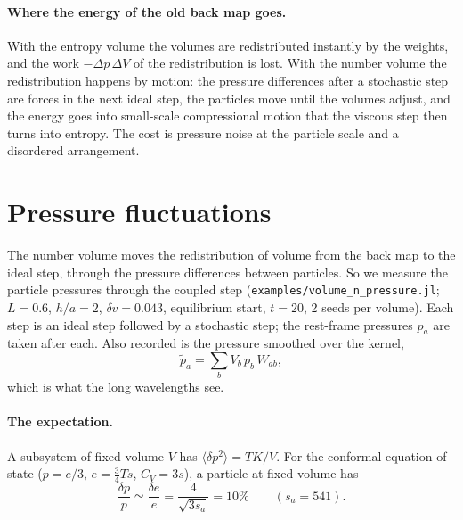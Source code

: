 \documentclass[11pt,aps,preprint,nofootinbib,superscriptaddress,tightenlines]{revtex4-2}
\def\st{\begin{equation}}
\def\stp{\end{equation}}
\newcommand{\avg}[1]{\langle #1\rangle}
\let\oldparagraph\paragraph
\renewcommand{\paragraph}{\par\bigskip\oldparagraph}
\begin{document}
\paragraph{Where the energy of the old back map goes.}  With the entropy volume the
volumes are redistributed instantly by the weights, and the work $-\Delta p\,\Delta V$
of the redistribution is lost.  With the number volume the redistribution happens by
motion: the pressure differences after a stochastic step are forces in the next ideal
step, the particles move until the volumes adjust, and the energy goes into small-scale
compressional motion that the viscous step then turns into entropy.  The cost is
pressure noise at the particle scale and a disordered arrangement.

\section{Pressure fluctuations}
\label{sec:pressure}

The number volume moves the redistribution of volume from the back map to the ideal step,
through the pressure differences between particles.  So we measure the particle pressures
through the coupled step (\texttt{examples/volume\_n\_pressure.jl}; $L=0.6$, $h/a=2$,
$\delta v=0.043$, equilibrium start, $t=20$, 2 seeds per volume).  Each step is an ideal
step followed by a stochastic step; the rest-frame pressures $p_a$ are taken after each.
Also recorded is the pressure smoothed over the kernel,
\st
\tilde p_a=\sum_bV_b\,p_b\,W_{ab},
\stp
which is what the long wavelengths see.

\paragraph{The expectation.}  A subsystem of fixed volume $V$ has $\avg{\delta p^2}=TK/V$.
For the conformal equation of state ($p=e/3$, $e=\tfrac34Ts$, $C_V=3s$), a particle at
fixed volume has
\st
\frac{\delta p}{p}\simeq\frac{\delta e}{e}=\frac{4}{\sqrt{3s_a}}=10\%\qquad(s_a=541).
\stp
\end{document}
